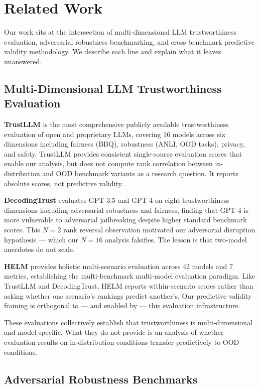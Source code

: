 \section{Related Work}
\label{sec:related}

Our work sits at the intersection of multi-dimensional LLM trustworthiness evaluation, adversarial robustness benchmarking, and cross-benchmark predictive validity methodology. We describe each line and explain what it leaves unanswered.

\subsection{Multi-Dimensional LLM Trustworthiness Evaluation}

\textbf{TrustLLM} \citep{Sun2024TrustLLM} is the most comprehensive publicly available trustworthiness evaluation of open and proprietary LLMs, covering 16 models across six dimensions including fairness (BBQ), robustness (ANLI, OOD tasks), privacy, and safety. TrustLLM provides consistent single-source evaluation scores that enable our analysis, but does not compute rank correlation between in-distribution and OOD benchmark variants as a research question. It reports absolute scores, not predictive validity.

\textbf{DecodingTrust} \citep{Wang2023DecodingTrust} evaluates GPT-3.5 and GPT-4 on eight trustworthiness dimensions including adversarial robustness and fairness, finding that GPT-4 is more vulnerable to adversarial jailbreaking despite higher standard benchmark scores. This $N=2$ rank reversal observation motivated our adversarial disruption hypothesis --- which our $N=16$ analysis falsifies. The lesson is that two-model anecdotes do not scale.

\textbf{HELM} \citep{Liang2022Holistic} provides holistic multi-scenario evaluation across 42 models and 7 metrics, establishing the multi-benchmark multi-model evaluation paradigm. Like TrustLLM and DecodingTrust, HELM reports within-scenario scores rather than asking whether one scenario's rankings predict another's. Our predictive validity framing is orthogonal to --- and enabled by --- this evaluation infrastructure.

These evaluations collectively establish that trustworthiness is multi-dimensional and model-specific. What they do not provide is an analysis of whether evaluation results on in-distribution conditions transfer predictively to OOD conditions.

\subsection{Adversarial Robustness Benchmarks}


